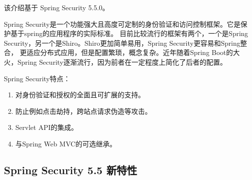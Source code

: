 该介绍基于 Spring Security 5.5.0。

Spring Security是一个功能强大且高度可定制的身份验证和访问控制框架。它是保护基于spring的应用程序的实际标准。
目前比较流行的框架有两个，一个是Spring Security，另一个是Shiro。Shiro更加简单易用，Spring Security更容易和Spring整合，
更适应分布式应用，但是配置繁琐，概念复杂。近年随着Spring Boot的大火，Spring Security逐渐流行，因为前者在一定程度上简化了后者的配置。

Spring Security特点：
\begin{enumerate}
  \item 对身份验证和授权的全面且可扩展的支持。
  \item 防止例如点击劫持，跨站点请求伪造等攻击。
  \item Servlet API的集成。
  \item 与Spring Web MVC的可选继承。
\end{enumerate}

\subsection{Spring Security 5.5 新特性}

